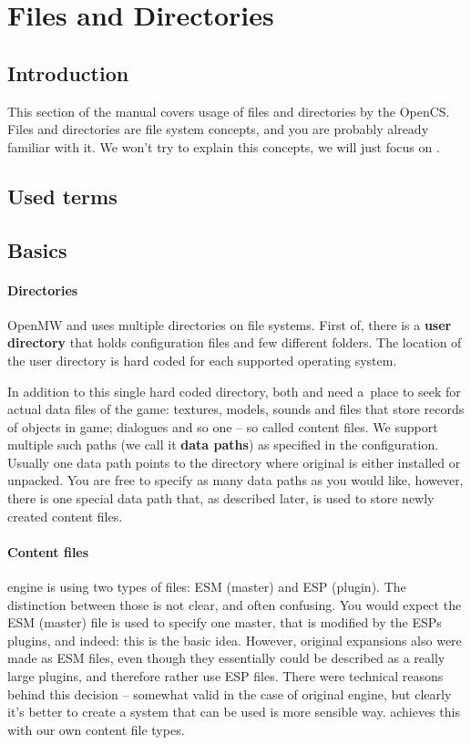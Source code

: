 \section{Files and Directories}
\subsection{Introduction}
This section of the manual covers usage of files and directories by the OpenCS. Files and directories are file system concepts,
and you are probably already familiar with it. We won't try to explain this concepts, we will just focus on \OCS.

\subsection{Used terms} %

\subsection{Basics}

\paragraph{Directories}
OpenMW and \OCS{} uses multiple directories on file systems. First of, there is a \textbf{user directory} that holds configuration
files and few different folders. The location of the user directory is hard coded for each supported operating system.

In addition to this single hard coded directory, both \OMW{} and \OCS{} need a~place to seek for actual data files of the game:
textures, models, sounds and files that store records of objects in game; dialogues and so one -- so called content files. We support
multiple such paths (we call it \textbf{data paths}) as specified in the configuration. Usually one data path points to the directory
where original \MW{} is either installed or unpacked. You are free to specify as many data paths as you would like,
however, there is one special data path that, as described later, is used to store newly created content files.

\paragraph{Content files}
\BS{} \MW{} engine is using two types of files: ESM (master) and ESP (plugin). The distinction between those
is not clear, and often confusing. You would expect the ESM (master) file is used to specify one master, that is modified by the ESPs plugins,
and indeed: this is the basic idea. However, original expansions also were made as ESM files, even though they essentially could be
described as a really large plugins, and therefore rather use ESP files. There were technical reasons behind this decision -- somewhat valid
in the case of original engine, but clearly it's better to create a system that can be used is more sensible way. \OMW{} achieves
this with our own content file types.

